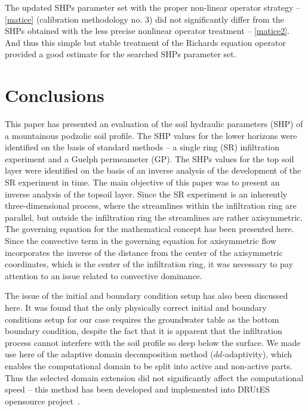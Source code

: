 \documentclass[review]{myarticle}
\begin{document}
The updated SHPs parameter set with the proper non-linear operator strategy  -- \eqref{matice} (calibration methodology no. 3)  did not significantly differ from the SHPs obtained with the less precise nonlinear operator treatment -- \eqref{matice2}. And thus this simple but  stable treatment  of the Richards equation operator provided a good estimate for the searched SHPs parameter set.

\section{Conclusions} %

This paper has presented an evaluation of the soil hydraulic parameters (SHP) of a mountainous podzolic soil profile. The SHP values for the lower horizons were identified on the basis of standard methods -- a single ring (SR) infiltration experiment and a Guelph permeameter (GP). The SHPs values for the top soil layer were identified on the basis of an inverse analysis of the development of the SR experiment in time. The main objective of this paper was to present an inverse analysis of the topsoil layer.  Since the SR experiment is an inherently three-dimensional process, where the streamlines within the infiltration ring are parallel, but outside the infiltration ring the streamlines are rather axisymmetric. The governing equation for the mathematical concept has been presented here. Since the convective term in the governing equation for axisymmetric flow incorporates the inverse of the distance from the center of the axisymmetric coordinates, which is the center of the infiltration ring, it was necessary to pay attention to an issue related to convective dominance.

The issue of the initial and boundary condition setup has also been discussed here. It was found  that the only physically correct  initial and boundary conditions setup for our  case requires the groundwater table as the bottom boundary condition, despite the fact that it is apparent that the infiltration process cannot interfere with the soil profile so deep below the surface.  We made use here of the adaptive domain decomposition method ($dd$-adaptivity), which enables the computational domain to be split into active and non-active parts. Thus the selected domain extension did not significantly affect the computational speed -- this method has been developed and implemented into DRUtES opensource project~\citep{drutes}.
\end{document}
